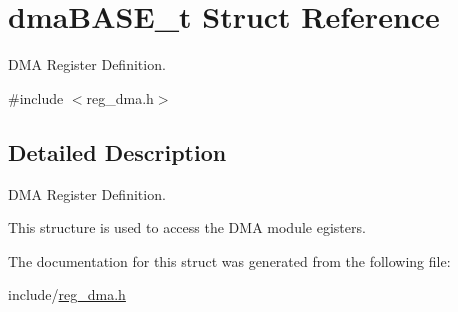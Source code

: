 \hypertarget{structdmaBASE__t}{}\section{dma\+B\+A\+S\+E\+\_\+t Struct Reference}
\label{structdmaBASE__t}


D\+MA Register Definition.  




{\ttfamily \#include $<$reg\+\_\+dma.\+h$>$}



\subsection{Detailed Description}
D\+MA Register Definition. 

This structure is used to access the D\+MA module egisters. 

The documentation for this struct was generated from the following file\+:\begin{DoxyCompactItemize}
\item 
include/\mbox{\hyperlink{reg__dma_8h}{reg\+\_\+dma.\+h}}\end{DoxyCompactItemize}
